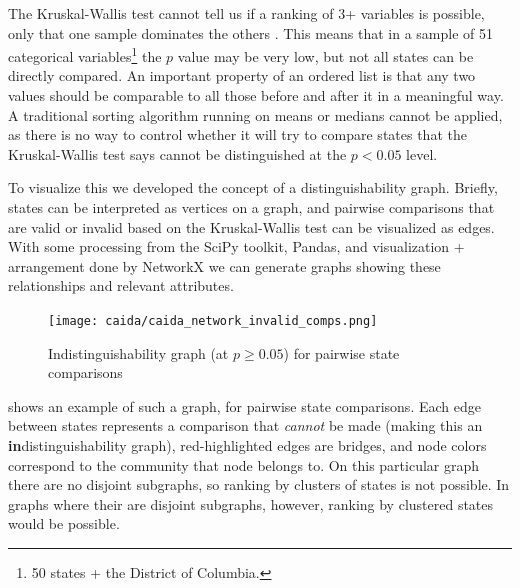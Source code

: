 The Kruskal-Wallis test cannot tell us if a ranking of 3+ variables is possible, only that one sample dominates the others \cite{kruskal-wallis}. This means that in a sample of 51 categorical variables\footnote{50 states + the District of Columbia.} the $p$ value may be very low, but not all states can be directly compared. An important property of an ordered list is that any two values should be comparable to all those before and after it in a meaningful way. A traditional sorting algorithm running on means or medians cannot be applied, as there is no way to control whether it will try to compare states that the Kruskal-Wallis test says cannot be distinguished at the $p<0.05$ level.

To visualize this we developed the concept of a distinguishability graph. Briefly, states can be interpreted as vertices on a graph, and pairwise comparisons that are valid or invalid based on the Kruskal-Wallis test can be visualized as edges. With some processing from the SciPy toolkit, Pandas, and visualization + arrangement done by NetworkX \cite{scipy, pandas, networkx} we can generate graphs showing these relationships and relevant attributes.

\begin{figure}[h]
    \centering
    \texttt{[image: caida/caida\_network\_invalid\_comps.png]}
    \caption{Indistinguishability graph (at $p\geq0.05$) for pairwise state comparisons}
    \label{fig:caida_network_invalid_comps}
\end{figure}

 shows an example of such a graph, for pairwise state comparisons. Each edge between states represents a comparison that \textit{cannot} be made (making this an \textbf{in}distinguishability graph), red-highlighted edges are bridges, and node colors correspond to the community that node belongs to. On this particular graph there are no disjoint subgraphs, so ranking by clusters of states is not possible. In graphs where their are disjoint subgraphs, however, ranking by clustered states would be possible.

